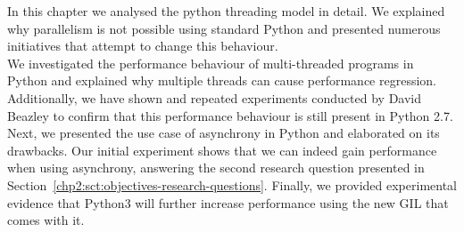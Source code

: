 In this chapter we analysed the python threading model in detail.
We explained why parallelism is not possible using standard Python and presented numerous initiatives that attempt to change this behaviour.\\
We investigated the performance behaviour of multi-threaded programs in Python and explained why multiple threads can cause performance regression.
Additionally, we have shown and repeated experiments conducted by David Beazley to confirm that this performance behaviour is still present in Python 2.7.\\
Next, we presented the use case of asynchrony in Python and elaborated on its drawbacks.
Our initial experiment shows that we can indeed gain performance when using asynchrony, answering the second research question presented in Section~\ref{chp2:sct:objectives-research-questions}.
Finally, we provided experimental evidence that Python3 will further increase performance using the new GIL that comes with it.